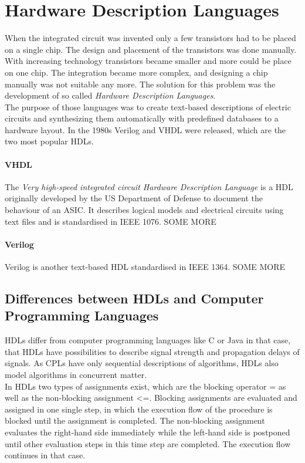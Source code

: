 \chapter{Hardware Description Languages}
\label{kap:HDL}
When the integrated circuit was invented only a few transistors had to be placed on a single chip. The design and placement of the transistors was done manually. With increasing technology transistors became smaller and more could be place on one chip. The integration became more complex, and designing a chip manually was not suitable any more. The solution for this problem was the development of so called \textit{Hardware Description Languages}.\\
The purpose of those languages was to create text-based descriptions of electric circuits and synthesizing them automatically with predefined databases to a hardware layout. In the 1980s Verilog and VHDL were released, which are the two most popular HDLs.
\subsubsection{VHDL}
The \textit{Very high-speed integrated circuit Hardware Description Language} is a HDL originally developed by the US Department of Defense to document the behaviour of an ASIC. It describes logical models and electrical circuits using text files and is standardised in IEEE 1076.
SOME MORE 
\subsubsection{Verilog}
Verilog is another text-based HDL standardised in IEEE 1364. 
SOME MORE
\section{Differences between HDLs and Computer Programming Languages}
HDLs differ from computer programming languages like C or Java in that case, that HDLs have possibilities to describe signal strength and propagation delays of signals. As CPLs have only sequential descriptions of algorithms, HDLs also model algorithms in concurrent matter.\\
In HDLs two types of assignments exist, which are the blocking operator = as well as the non-blocking assignment \textless=. Blocking assignments are evaluated and assigned in one single step, in which the execution flow of the procedure is blocked until the assignment is completed. The non-blocking assignment evaluates the right-hand side immediately while the left-hand side is postponed until other evaluation steps in this time step are completed. The execution flow continues in that case.\cite{Sut96}

